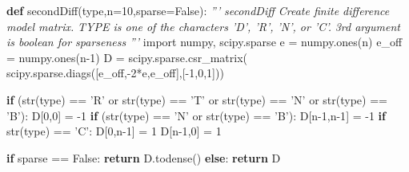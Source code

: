 \documentclass[12pt,]{book}
\newenvironment{Shaded}{}{}
\newcommand{\KeywordTok}[1]{\textcolor[rgb]{0.00,0.44,0.13}{\textbf{{#1}}}}
\newcommand{\DecValTok}[1]{\textcolor[rgb]{0.25,0.63,0.44}{{#1}}}
\newcommand{\StringTok}[1]{\textcolor[rgb]{0.25,0.44,0.63}{{#1}}}
\newcommand{\ImportTok}[1]{{#1}}
\newcommand{\CommentTok}[1]{\textcolor[rgb]{0.38,0.63,0.69}{\textit{{#1}}}}
\newcommand{\VariableTok}[1]{\textcolor[rgb]{0.10,0.09,0.49}{{#1}}}
\newcommand{\ControlFlowTok}[1]{\textcolor[rgb]{0.00,0.44,0.13}{\textbf{{#1}}}}
\newcommand{\OperatorTok}[1]{\textcolor[rgb]{0.40,0.40,0.40}{{#1}}}
\newcommand{\BuiltInTok}[1]{{#1}}
\newcommand{\NormalTok}[1]{{#1}}
\begin{document}
\begin{Shaded}
\begin{Highlighting}[]
\KeywordTok{def} \NormalTok{secondDiff(}\BuiltInTok{type}\NormalTok{,n}\OperatorTok{=}\DecValTok{10}\NormalTok{,sparse}\OperatorTok{=}\VariableTok{False}\NormalTok{):}
    \CommentTok{'''}
\CommentTok{    secondDiff Create finite difference model matrix.}
\CommentTok{    TYPE is one of the characters 'D', 'R', 'N', or 'C'.}
\CommentTok{    3rd argument is boolean for sparseness}
\CommentTok{    '''}
    \ImportTok{import} \NormalTok{numpy, scipy.sparse}
    \NormalTok{e }\OperatorTok{=} \NormalTok{numpy.ones(n)}
    \NormalTok{e_off }\OperatorTok{=} \NormalTok{numpy.ones(n}\DecValTok{-1}\NormalTok{)}
    \NormalTok{D }\OperatorTok{=} \NormalTok{scipy.sparse.csr_matrix(}
      \NormalTok{scipy.sparse.diags([e_off,}\OperatorTok{-}\DecValTok{2}\OperatorTok{*}\NormalTok{e,e_off],[}\OperatorTok{-}\DecValTok{1}\NormalTok{,}\DecValTok{0}\NormalTok{,}\DecValTok{1}\NormalTok{]))}

    \ControlFlowTok{if} \NormalTok{(}\BuiltInTok{str}\NormalTok{(}\BuiltInTok{type}\NormalTok{) }\OperatorTok{==} \StringTok{'R'} \OperatorTok{or} \BuiltInTok{str}\NormalTok{(}\BuiltInTok{type}\NormalTok{) }\OperatorTok{==} \StringTok{'T'} \OperatorTok{or} 
        \BuiltInTok{str}\NormalTok{(}\BuiltInTok{type}\NormalTok{) }\OperatorTok{==} \StringTok{'N'} \OperatorTok{or} \BuiltInTok{str}\NormalTok{(}\BuiltInTok{type}\NormalTok{) }\OperatorTok{==} \StringTok{'B'}\NormalTok{):}
        \NormalTok{D[}\DecValTok{0}\NormalTok{,}\DecValTok{0}\NormalTok{] }\OperatorTok{=} \OperatorTok{-}\DecValTok{1}
    \ControlFlowTok{if} \NormalTok{(}\BuiltInTok{str}\NormalTok{(}\BuiltInTok{type}\NormalTok{) }\OperatorTok{==} \StringTok{'N'} \OperatorTok{or} \BuiltInTok{str}\NormalTok{(}\BuiltInTok{type}\NormalTok{) }\OperatorTok{==} \StringTok{'B'}\NormalTok{): }
        \NormalTok{D[n}\DecValTok{-1}\NormalTok{,n}\DecValTok{-1}\NormalTok{] }\OperatorTok{=} \OperatorTok{-}\DecValTok{1}
    \ControlFlowTok{if} \BuiltInTok{str}\NormalTok{(}\BuiltInTok{type}\NormalTok{) }\OperatorTok{==} \StringTok{'C'}\NormalTok{:}
        \NormalTok{D[}\DecValTok{0}\NormalTok{,n}\DecValTok{-1}\NormalTok{] }\OperatorTok{=} \DecValTok{1}
        \NormalTok{D[n}\DecValTok{-1}\NormalTok{,}\DecValTok{0}\NormalTok{] }\OperatorTok{=} \DecValTok{1}

    \ControlFlowTok{if} \NormalTok{sparse }\OperatorTok{==} \VariableTok{False}\NormalTok{: }\ControlFlowTok{return} \NormalTok{D.todense()}
    \ControlFlowTok{else}\NormalTok{: }\ControlFlowTok{return} \NormalTok{D}
\end{Highlighting}
\end{Shaded}
\end{document}
